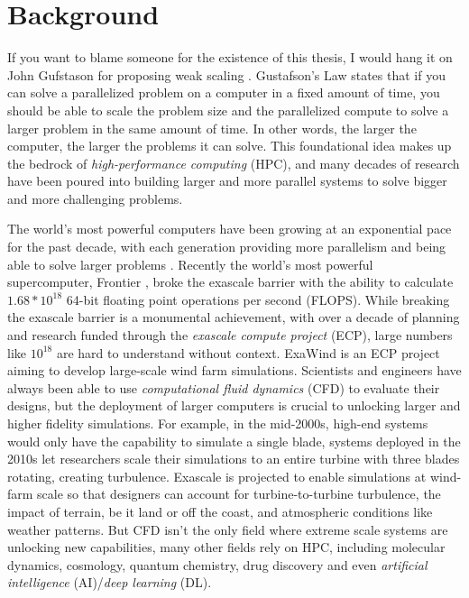 
\chapter[Background]{Background}\label{ch:Background}

If you want to blame someone for the existence of this thesis, I would hang it on John Gufstason for proposing weak scaling \cite{Gustafson1988GustafsonLaw}.
Gustafson's Law states that if you can solve a parallelized problem on a computer in a fixed amount of time, you should be able to scale the problem size and the parallelized compute to solve a larger problem in the same amount of time.
In other words, the larger the computer, the larger the problems it can solve.
This foundational idea makes up the bedrock of \textit{high-performance computing} (HPC), and many decades of research have been poured into building larger and more parallel systems to solve bigger and more challenging problems.

The world's most powerful computers have been growing at an exponential pace for the past decade, with each generation providing more parallelism and being able to solve larger problems \cite{Top500}.
Recently the world's most powerful supercomputer, Frontier \cite{Frontier}, broke the exascale barrier with the ability to calculate $1.68*10^{18}$ 64-bit floating point operations per second (FLOPS). 
While breaking the exascale barrier is a monumental achievement, with over a decade of planning and research funded through the \textit{exascale compute project} (ECP), large numbers like $10^{18}$ are hard to understand without context.
ExaWind \cite{ExaWind} is an ECP project aiming to develop large-scale wind farm simulations.
Scientists and engineers have always been able to use \textit{computational fluid dynamics} (CFD) to evaluate their designs, but the deployment of larger computers is crucial to unlocking larger and higher fidelity simulations.
For example, in the mid-2000s, high-end systems would only have the capability to simulate a single blade, systems deployed in the 2010s let researchers scale their simulations to an entire turbine with three blades rotating, creating turbulence.
Exascale is projected to enable simulations at wind-farm scale so that designers can account for turbine-to-turbine turbulence, the impact of terrain, be it land or off the coast, and atmospheric conditions like weather patterns.
But CFD isn't the only field where extreme scale systems are unlocking new capabilities, many other fields rely on HPC, including molecular dynamics, cosmology, quantum chemistry, drug discovery and even \textit{artificial intelligence} (AI)/\textit{deep learning} (DL). 

